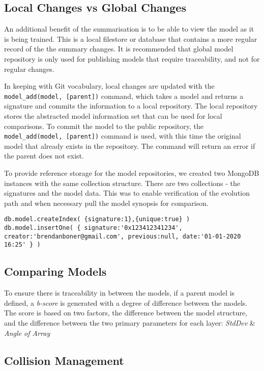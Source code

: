 \subsection{Local Changes vs Global Changes}

An additional benefit of the summarisation is to be able to view the model as it is being trained. This is a local filestore or database that contains a more regular record of the the summary changes. It is recommended that global model repository is only used for publishing models that require traceability, and not for regular changes.

In keeping with Git vocabulary, local changes are updated with the \verb|model_add(model, [parent])| command, which takes a model and returns a signature and commits the information to a local repository. The local repository stores the abstracted model information set that can be used for local comparisons.
To commit the model to the public repository, the \verb|model_add(model, [parent])| command is used, with this time the original model that already exists in the repository. The command will return an error if the parent does not exist.

To provide reference storage for the model repositories, we created two MongoDB instances with the same collection structure. There are two collections - the signatures and the model data. This was to enable verification of the evolution path and when necessary pull the model synopsis for comparison.

\begin{lstlisting}
db.model.createIndex( {signature:1},{unique:true} )
db.model.insertOne( { signature:'0x123412341234', creator:'brendanboner@gmail.com', previous:null, date:'01-01-2020 16:25' } )
\end{lstlisting}

\subsection{Comparing Models}
To ensure there is traceability in between the models, if a parent model is defined, a \textit{b-score} is generated with a degree of difference between the models. The score is based on two factors, the difference between the model structure, and the difference between the two primary parameters for each layer: \textit{StdDev} \& \textit{Angle of Array}

\subsection{Collision Management}

